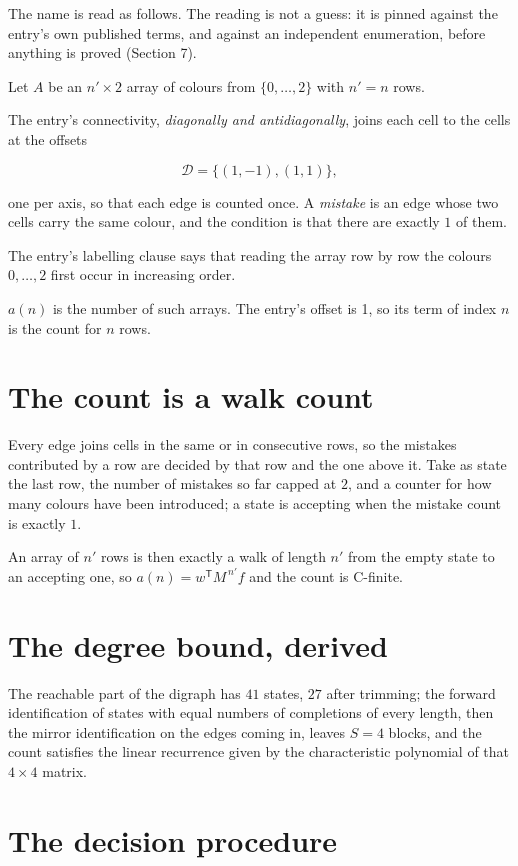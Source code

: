 \documentclass[11pt]{article}
\theoremstyle{definition}
\begin{document}
The name is read as follows. The reading is not a guess: it is pinned against the entry's own published terms, and against an independent enumeration, before anything is proved (Section 7).

Let $A$ be an $n' \times 2$ array of colours from $\{0,\dots,2\}$ with $n' = n$ rows.

The entry's connectivity, {\itshape diagonally and antidiagonally}, joins each cell to the cells at the offsets

\[\mathcal{D} = \{(1,-1), (1,1)\},\]

one per axis, so that each edge is counted once. A {\itshape mistake} is an edge whose two cells carry the same colour, and the condition is that there are exactly $1$ of them.

The entry's labelling clause says that reading the array row by row the colours $0,\dots,2$ first occur in increasing order.

$a(n)$ is the number of such arrays. The entry's offset is 1, so its term of index $n$ is the count for $n$ rows.

\section{The count is a walk count}

Every edge joins cells in the same or in consecutive rows, so the mistakes contributed by a row are decided by that row and the one above it. Take as state the last row, the number of mistakes so far capped at $2$, and a counter for how many colours have been introduced; a state is accepting when the mistake count is exactly $1$.

An array of $n'$ rows is then exactly a walk of length $n'$ from the empty state to an accepting one, so $a(n) = w^{\mathsf T}M^{\,n'}f$ and the count is C-finite.

\section{The degree bound, derived}

The reachable part of the digraph has $41$ states, $27$ after trimming; the forward identification of states with equal numbers of completions of every length, then the mirror identification on the edges coming in, leaves $S = 4$ blocks, and the count satisfies the linear recurrence given by the characteristic polynomial of that $4\times4$ matrix.

\section{The decision procedure}
\end{document}
